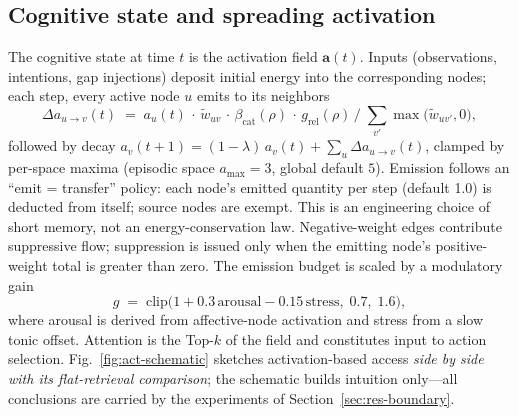 \documentclass[10pt]{article}
\begin{document}
\subsection{Cognitive state and spreading activation}
\label{sec:arch-act}
The cognitive state at time $t$ is the activation field $\mathbf{a}(t)$. Inputs (observations, intentions, gap injections) deposit initial energy into the corresponding nodes; each step, every active node $u$ emits to its neighbors
\begin{equation}
\Delta a_{u\rightarrow v}(t) \;=\; a_u(t)\,\cdot\, \tilde w_{uv}\,\cdot\, \beta_{\mathrm{cat}}(\rho)\,\cdot\, g_{\mathrm{rel}}(\rho)\,\Big/\; \textstyle\sum_{v'} \max\big(\tilde w_{uv'},0\big),
\label{eq:spread}
\end{equation}
followed by decay $a_v(t{+}1) = (1-\lambda)\,a_v(t) + \sum_u \Delta a_{u\rightarrow v}(t)$, clamped by per-space maxima (episodic space $a_{\max}{=}3$, global default $5$). Emission follows an ``emit = transfer'' policy: each node's emitted quantity per step (default 1.0) is deducted from itself; source nodes are exempt. This is an engineering choice of short memory, not an energy-conservation law. Negative-weight edges contribute suppressive flow; suppression is issued only when the emitting node's positive-weight total is greater than zero. The emission budget is scaled by a modulatory gain
\begin{equation}
g \;=\; \mathrm{clip}\big(1 + 0.3\,\mathrm{arousal} - 0.15\,\mathrm{stress},\; 0.7,\; 1.6\big),
\label{eq:mod}
\end{equation}
where arousal is derived from affective-node activation and stress from a slow tonic offset. Attention is the Top-$k$ of the field and constitutes input to action selection. Fig.~\ref{fig:act-schematic} sketches activation-based access \emph{side by side with its flat-retrieval comparison}; the schematic builds intuition only---all conclusions are carried by the experiments of Section~\ref{sec:res-boundary}.
\end{document}
